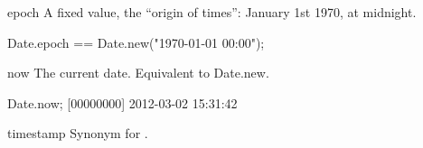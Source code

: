 \begin{urbiscriptapi}
\item[epoch]
  A fixed value, the ``origin of times'': January 1st 1970, at
  midnight.
\begin{urbiunchecked}
Date.epoch == Date.new("1970-01-01 00:00");
\end{urbiunchecked}

\item[now] The current date. Equivalent to Date.new.
\begin{urbiunchecked}
Date.now;
[00000000] 2012-03-02 15:31:42
\end{urbiunchecked}

\item[timestamp] Synonym for .
\end{urbiscriptapi}


